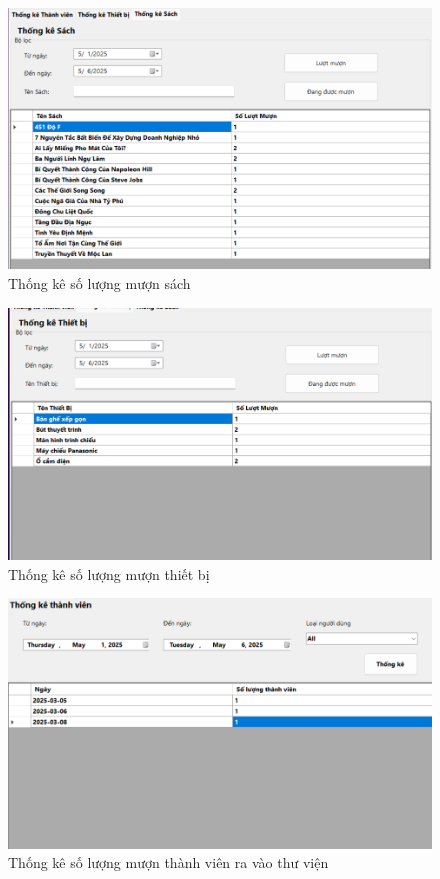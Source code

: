 \documentclass{article}
\begin{document}
\begin{figure} [H]
    \centering
    \includegraphics[width=0.8\linewidth]{images//Winform/cn ql tk1.png}
    \caption{Thống kê số lượng mượn sách}
    \label{fig:enter-label}
\end{figure}

\begin{figure} [H]
    \centering
    \includegraphics[width=0.8\linewidth]{images//Winform/cn ql tk2.png}
    \caption{Thống kê số lượng mượn thiết bị}
    \label{fig:enter-label}
\end{figure}

\begin{figure} [H]
    \centering
    \includegraphics[width=0.8\linewidth]{images//Winform/cn ql tk3.png}
    \caption{Thống kê số lượng mượn thành viên ra vào thư viện}
    \label{fig:enter-label}
\end{figure}
\end{document}
